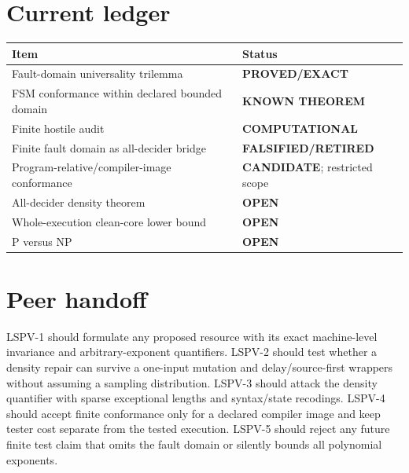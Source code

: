 \documentclass[11pt]{article}
\newcommand{\EXACT}{\textbf{PROVED/EXACT}}
\newcommand{\KNOWN}{\textbf{KNOWN THEOREM}}
\newcommand{\COMP}{\textbf{COMPUTATIONAL}}
\newcommand{\CAND}{\textbf{CANDIDATE}}
\newcommand{\OPEN}{\textbf{OPEN}}
\newcommand{\RET}{\textbf{FALSIFIED/RETIRED}}
\begin{document}
\section*{Current ledger}
\begin{center}\small
\begin{tabular}{p{}p{}}
\toprule
Item & Status\\
\midrule
Fault-domain universality trilemma & \EXACT{}\\
FSM conformance within declared bounded domain & \KNOWN{}\\
Finite hostile audit & \COMP{}\\
Finite fault domain as all-decider bridge & \RET{}\\
Program-relative/compiler-image conformance & \CAND{}; restricted scope\\
All-decider density theorem & \OPEN{}\\
Whole-execution clean-core lower bound & \OPEN{}\\
P versus NP & \OPEN{}\\
\bottomrule
\end{tabular}
\end{center}

\section*{Peer handoff}
LSPV-1 should formulate any proposed resource with its exact machine-level
invariance and arbitrary-exponent quantifiers.  LSPV-2 should test whether a
density repair can survive a one-input mutation and delay/source-first
wrappers without assuming a sampling distribution.  LSPV-3 should attack the
density quantifier with sparse exceptional lengths and syntax/state recodings.
LSPV-4 should accept finite conformance only for a declared compiler image and
keep tester cost separate from the tested execution.  LSPV-5 should reject any
future finite test claim that omits the fault domain or silently bounds all
polynomial exponents.
\end{document}

